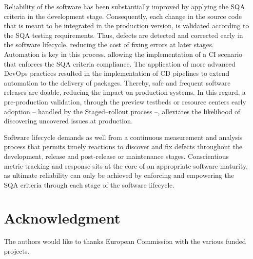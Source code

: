 \documentclass[journal]{IEEEtran}
\begin{document}
Reliability of the software has been substantially improved by applying the SQA
criteria in the development stage. Consequently, each change in the source code 
that is meant to be integrated in the production version, is validated according
to the SQA testing requirements. Thus, defects are detected and corrected early in the 
software lifecycle, reducing the cost of fixing errors at later stages. Automation is
key in this process, allowing the implementation of a CI scenario that enforces
the SQA criteria compliance. The application of more advanced DevOps practices
resulted in the implementation of CD pipelines to extend automation to the
delivery of packages. Thereby, safe and frequent software releases are doable, reducing
the impact on production systems. In this regard, a pre-production validation,
through the preview testbeds or resource centers early adoption -- handled by the
Staged--rollout process --, alleviates the likelihood of discovering uncovered
issues at production.

Software lifecycle demands as well from a continuous measurement and analysis
process that permits timely reactions to discover and fix defects throughout the
development, release and post-release or maintenance stages. Conscientious metric
tracking and response sits at the core of an appropriate software maturity, as 
ultimate reliability can only be achieved by enforcing and empowering the SQA 
criteria through each stage of the software lifecycle.

\section*{Acknowledgment}

The authors would like to thanks European Commission with the various funded
projects.
\end{document}
